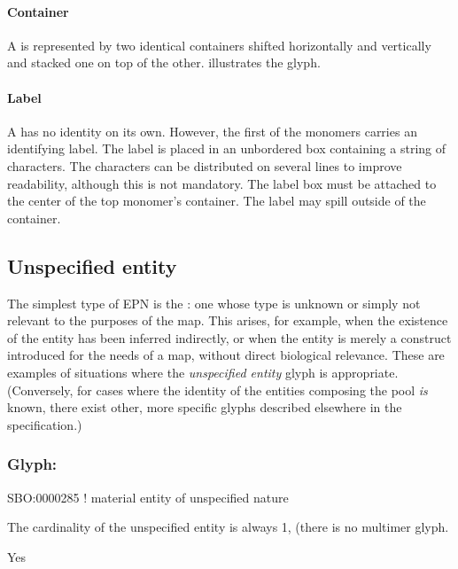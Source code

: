 \paragraph{Container}

 A  is represented by two identical containers shifted horizontally and vertically and stacked one on top of the other.   illustrates the glyph.

\paragraph{Label}

A  has no identity on its own.  However, the first of the monomers carries an identifying label.  The label is placed in an unbordered box containing a string of characters.  The characters can be distributed on several lines to improve readability, although this is not mandatory.  The label box must be attached to the center of the top monomer's container.  The label may spill outside of the container.

\subsection{Unspecified entity}
\label{sec:unspecifiedEntity}

The simplest type of EPN is the : one whose type is unknown or simply not relevant to the purposes of the map.  This arises, for example, when the existence of the entity has been inferred indirectly, or when the entity is merely a construct introduced for the needs of a map, without direct biological relevance.  These are examples of situations where the \emph{unspecified entity} glyph is appropriate.  (Conversely, for cases where the identity of the entities composing the pool \emph{is} known, there exist other, more specific glyphs described elsewhere in the specification.)

\subsubsection{Glyph: }

\begin{glyphDescription}
\glyphSboTerm SBO:0000285 ! material entity of unspecified nature 
\glyphAux 
\glyphRules%
\begin{inparaenum}
\item The cardinality of
  the unspecified entity is always 1, \ie (there is no multimer glyph.
\end{inparaenum}
\glyphCloning Yes
\end{glyphDescription}

